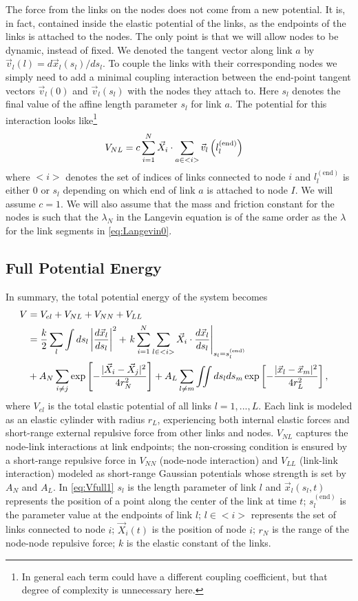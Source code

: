 \documentclass[endfloats,nofootinbib,preprint,floatfix,titlepage,superscriptaddress]{revtex4} %
\begin{document}
The force from the links on the nodes does  not come from a new potential. 
It is, in fact, contained inside the elastic potential of the links, %
as the endpoints of the links is attached to the nodes. The only point is that we will allow nodes to be dynamic, instead of fixed. We denoted the tangent vector along link $a$ by $\vec{v}_l(l) = d\vec{x}_l(s_l)/ds_l $. To couple the links with their corresponding nodes we simply need to add a minimal coupling interaction between the end-point tangent vectors $\vec{v}_l (0)$ and $\vec{v}_l (s_l)$ with the nodes they attach to. Here $s_l$ denotes the final value of the affine length parameter $s_l$ for link $a$. The potential for this interaction looks like\footnote{In general each term could have a different coupling coefficient, but that degree of complexity is unnecessary here.}
\begin{align}
   V_{NL} & =c\sum_{i=1}^N \vec{X}_i \cdot \sum_{a\in <i>}  \vec{v}_l\left(l^{(\mathrm{end})}_l\right)
\end{align}
where $<i>$ denotes the set of indices of links connected to node $i$ and $l^{(\mathrm{end})}_l$ is either $0$ or $s_l$ depending on which end of link $a$ is attached to node $I$. We will assume $c =1$. We will also assume that the mass and friction constant for the nodes is such that the $\lambda_N$ in the Langevin equation is of the same order as the $\lambda$ for the link segments in \eqref{eq:Langevin0}. 

\subsection{Full Potential Energy}
In summary, the total potential energy of the system becomes
\begin{align}
    V &= V_{el} + V_{NL} +V_{NN} + V_{LL} \cr 
    &= {k\over 2}\sum_l\int ds_l \left|{d\vec{x}_l\over ds_l} \right|^2 + 
    \left. k\sum_{i=1}^N  \sum_{l\in <i>}  \vec{X}_i \cdot{d\vec{x}_l%
    \over ds_l}\right|_{s_l = s_l^{(\mathrm{end})}}
    \cr
    &+ A_N\sum_{i\ne j}  \exp\left[- {|\vec{X}_i-\vec{X}_j|^2 \over 4r_N^2}\right]+A_L\sum_{l\ne m} \iint ds_lds_m 
    \exp\left[- {|\vec{x}_l-\vec{x}_m|^2 \over 4 r_L^2}\right] ,
 \label{eq:Vfull1}
\end{align}
where $V_{el}$ is the total elastic potential of all links $l=1,...,L$. 
Each link is modeled as an elastic cylinder with radius $r_L$, experiencing both internal elastic forces and short-range external repulsive force from other links and nodes. $V_{NL}$ captures the node-link interactions at link endpoints;
the non-crossing condition is ensured by a short-range repulsive force in
$V_{NN}$  (node-node interaction)  and  $V_{LL}$ (link-link interaction) modeled as short-range Gaussian potentials whose strength is set by $A_N$ and $A_L$. 
In \eqref{eq:Vfull1} $s_l$ is the length parameter of link $l$ and  $\vec{x}_l(s_l,t)$ represents the position of a point along the center of the link at time $t$;
$s_l^\mathrm{(end)}$ is the parameter value at the endpoints of link $l$;
$l\in <i>$ represents the set of links connected to node $i$; 
$\vec{X}_i(t)$ is the position of node $i$; $r_N$ is the range of the node-node repulsive force; $k$ is the elastic constant of the links.
\end{document}
